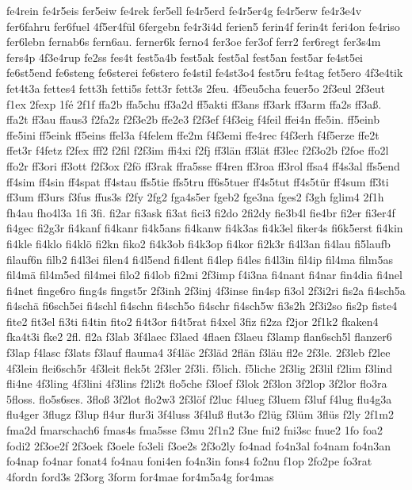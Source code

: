{fe4rein
fe4r5eis
fer5eiw
fe4rek
fer5ell
fe4r5erd
fe4r5er4g
fe4r5erw
fe4r3e4v
fer6fahru
fer6fuel
4f5er4fül
6fergebn
fe4r3i4d
ferien5
ferin4f
ferin4t
feri4on
fe4riso
fer6lebn
fernab6s
fern6au.
ferner6k
ferno4
fer3oe
fer3of
ferr2
fer6regt
fer3s4m
fers4p
4f3e4rup
fe2ss
fes4t
fest5a4b
fest5ak
fest5al
fest5an
fest5ar
fe4st5ei
fe6st5end
fe6steng
fe6sterei
fe6stero
fe4stil
fe4st3o4
fest5ru
fe4tag
fet5ero
4f3e4tik
fet4t3a
fettes4
fett3h
fetti5s
fett3r
fett3s
2feu.
4f5eu5cha
feuer5o
2f3eul
2f3eut
f1ex
2fexp
1fé
2f1f
ffa2b
ffa5chu
ff3a2d
ff5akti
ff3ans
ff3ark
ff3arm
ffa2s
ff3aß.
ffa2t
ff3au
ffaus3
f2fa2z
f2f3e2b
ffe2e3
f2f3ef
f4f3eig
f4feil
ffei4n
ffe5in.
ff5einb
ffe5ini
ff5eink
ff5eins
ffel3a
f4felem
ffe2m
f4f3emi
ffe4rec
f4f3erh
f4f5erze
ffe2t
ffet3r
f4fetz
f2fex
fff2
f2fil
f2f3im
ffi4xi
f2fj
ff3län
ff3lät
ff3lec
f2f3o2b
f2foe
ffo2l
ffo2r
ff3ori
ff3ott
f2f3ox
f2fö
ff3rak
ffra5sse
ff4ren
ff3roa
ff3rol
ffsa4
ff4s3al
ffs5end
ff4sim
ff4sin
ff4spat
ff4stau
ffs5tie
ffs5tru
ff6s5tuer
ff4s5tut
ff4s5tür
ff4sum
ff3ti
ff3um
ff3urs
f3fus
ffus3s
f2fy
2fg2
fga4s5er
fgeb2
fge3na
fges2
f3gh
fglim4
2f1h
fh4au
fho4l3a
1fi
3fi.
fi2ar
fi3ask
fi3at
fici3
fi2do
2fi2dy
fie3b4l
fie4br
fi2er
fi3er4f
fi4gec
fi2g3r
fi4kanf
fi4kanr
fi4k5ans
fi4kanw
fi4k3as
fi4k3el
fiker4s
fi6k5erst
fi4kin
fi4kle
fi4klo
fi4klö
fi2kn
fiko2
fi4k3ob
fi4k3op
fi4kor
fi2k3r
fi4l3an
fi4lau
fi5laufb
filauf6n
filb2
fi4l3ei
filen4
fi4l5end
fi4lent
fi4lep
fi4les
fi4l3in
fil4ip
fil4ma
film5as
fil4mä
fil4m5ed
fil4mei
filo2
fi4lob
fi2mi
2f3imp
f4i3na
fi4nant
fi4nar
fin4dia
fi4nel
fi4net
finge6ro
fing4s
fingst5r
2f3inh
2f3inj
4f3inse
fin4sp
fi3ol
2f3i2ri
fis2a
fi4sch5a
fi4schä
fi6sch5ei
fi4schl
fi4schn
fi4sch5o
fi4schr
fi4sch5w
fi3s2h
2f3i2so
fis2p
fiste4
fite2
fit3el
fi3ti
fi4tin
fito2
fi4t3or
fi4t5rat
fi4xel
3fiz
fi2za
f2jor
2f1k2
fkaken4
fka4t3i
fke2
2fl.
fl2a
f3lab
3f4laec
f3laed
4flaen
f3laeu
f3lamp
flan6sch5l
flanzer6
f3lap
f4lasc
f3lats
f3lauf
flauma4
3f4läc
2f3läd
2flän
f3läu
fl2e
2f3le.
2f3leb
f2lee
4f3lein
flei6sch5r
4f3leit
flek5t
2f3ler
2f3li.
f5lich.
f5liche
2f3lig
2f3lil
f2lim
f3lind
fli4ne
4f3ling
4f3lini
4f3lins
f2li2t
flo5che
f3loef
f3lok
2f3lon
3f2lop
3f2lor
flo3ra
5floss.
flo5s6ses.
3floß
3f2lot
flo2w3
2f3löf
f2luc
f4lueg
f3luem
f3luf
f4lug
flu4g3a
flu4ger
3flugz
f3lup
fl4ur
flur3i
3f4luss
3f4luß
flut3o
f2lüg
f3lüm
3flüs
f2ly
2f1m2
fma2d
fmarschach6
fmas4s
fma5sse
f3mu
2f1n2
f3ne
fni2
fni3sc
fnue2
1fo
foa2
fodi2
2f3oe2f
2f3oek
f3oele
fo3eli
f3oe2s
2f3o2ly
fo4nad
fo4n3al
fo4nam
fo4n3an
fo4nap
fo4nar
fonat4
fo4nau
foni4en
fo4n3in
fons4
fo2nu
f1op
2fo2pe
fo3rat
4fordn
ford3s
2f3org
3form
for4mae
for4m5a4g
for4mas
}
